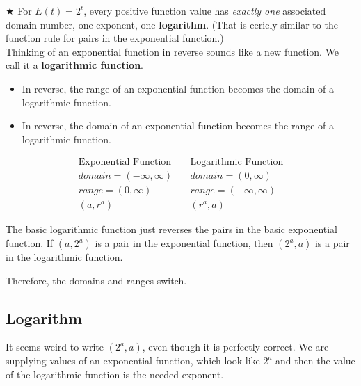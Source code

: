\documentclass{ximera}
\begin{document}
\textbf{\textcolor{red!90!darkgray}{$\bigstar$}} For $E(t) = 2^t$, every positive function value has \textit{exactly one} associated domain number, one exponent, one \textbf{\textcolor{purple!85!blue}{logarithm}}. (That is eeriely similar to the function rule for pairs in the exponential function.) \\ 




Thinking of an exponential function in reverse sounds like a new function. We call it a \textbf{\textcolor{purple!85!blue}{logarithmic function}}.   \\


\begin{itemize}
\item In reverse, the range of an exponential function becomes the domain of a logarithmic function.
\item In reverse, the domain of an exponential function becomes the range of a logarithmic function.
\end{itemize}





\[
\begin{array}{lcl}
\text{Exponential Function}  &     &  \text{Logarithmic Function}  \\
domain = (-\infty, \infty)  &  \   &  domain = (0, \infty)  \\
range = (0, \infty)  &    &  range = (-\infty, \infty)  \\
(a, r^a)    &    &   (r^a, a)
\end{array}
\]


The basic logarithmic function just reverses the pairs in the basic exponential function.  If $(a, 2^a)$ is a pair in the exponential function, then $(2^a, a)$ is a pair in the logarithmic function.


Therefore, the domains and ranges switch. \\






\subsection{Logarithm}

It seems weird to write $(2^a, a)$, even though it is perfectly correct.  We are supplying values of an exponential function, which look like $2^a$ and then the value of the logarithmic function is the needed exponent.
\end{document}

